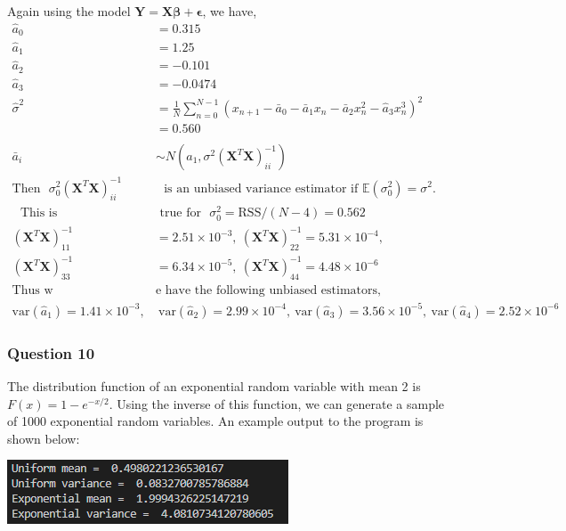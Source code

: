 \documentclass[12pt, a4paper]{article}
\begin{document}
Again using the model $\bm{Y} = \bm{X\beta} + \bm{\epsilon}$, we have,
\begin{align*}
	\hat{a}_{0} & = 0.315  \\
	\hat{a}_{1} & = 1.25 \\
	\hat{a}_{2} & = -0.101 \\
	\hat{a}_{3} & = -0.0474 \\
	\hat{\sigma}^{2} & = \frac{1}{N} \sum_{n = 0}^{N-1}(x_{n+1} - \bar{a}_{0} - \bar{a}_{1}x_{n} - \bar{a}_{2}x_{n}^{2} - \hat{a}_{3}x_{n}^{3} )^{2} \\
	& = 0.560 \\
	\\
	\bar{a}_{i} & \sim N\left( a_{1},  \sigma^{2}(\bm{X}^{T}\bm{X})^{-1}_{ii} \right) \\
	\text{Then ~} \sigma^{2}_{0}(\bm{X}^{T}\bm{X})^{-1}_{ii} & \text{~ is an unbiased variance estimator if } \mathbb{E}(\sigma^{2}_{0}) = \sigma^{2}. \\
	\text{~ This is} & \text{ true for ~} \sigma^{2}_{0} = \text{RSS}/(N-4) = 0.562 \\
	(\bm{X}^{T}\bm{X})^{-1}_{11} & = 2.51\times10^{-3}, ~ (\bm{X}^{T}\bm{X})^{-1}_{22} = 5.31\times10^{-4}, \\ (\bm{X}^{T}\bm{X})^{-1}_{33} & = 6.34\times10^{-5}, ~ (\bm{X}^{T}\bm{X})^{-1}_{44} = 4.48\times10^{-6} \\
	\text{Thus w} & \text{e have the following unbiased estimators, ~} \\
	\text{var}(\hat{a}_{1}) = 1.41\times10^{-3}, & ~ \text{var}(\hat{a}_{2}) = 2.99\times10^{-4}, ~ \text{var}(\hat{a}_{3}) = 3.56\times10^{-5}, ~ \text{var}(\hat{a}_{4}) = 2.52\times10^{-6}
\end{align*}


\subsubsection*{Question 10}

The distribution function of an exponential random variable with mean 2 is $F(x) = 1-e^{-x/2}$. Using the inverse of this function, we can generate a sample of 1000 exponential random variables. An example output to the program is shown below:
\vspace{0.2cm}\\
\begin{minipage}{\textwidth}
	\centering
	\includegraphics[width = 0.5\linewidth]{q10_fig1}
	\label{q10_fig1}
\end{minipage}
\end{document}
